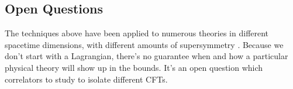 \documentclass[11pt]{ws-rv9x6}
\newcommand\<\langle
\renewcommand\>\rangle
\renewcommand\.{\cdot}
\begin{document}
\subsection{Open Questions}

The techniques above have been applied to numerous theories in different spacetime dimensions, with different amounts of supersymmetry \cite{Rattazzi:2008pe, Rychkov:2009ij, Caracciolo:2009bx, Poland:2010wg, Rattazzi:2010gj, Rattazzi:2010yc, Vichi:2011ux, Poland:2011ey, Rychkov:2011et, ElShowk:2012ht,Liendo:2012hy, Beem:2013qxa, Kos:2013tga, El-Showk:2013nia, Alday:2013opa, Gaiotto:2013nva,Bashkirov:2013vya, Berkooz:2014yda, El-Showk:2014dwa, Nakayama:2014lva,Nakayama:2014yia, Alday:2014qfa, Chester:2014fya, Kos:2014bka, Caracciolo:2014cxa, Nakayama:2014sba, Golden:2014oqa, Chester:2014mea, Paulos:2014vya, Beem:2014zpa, Simmons-Duffin:2015qma, Bobev:2015vsa, Bobev:2015jxa, Kos:2015mba, Chester:2015qca, Beem:2015aoa, Iliesiu:2015qra,poland2015exploring,Lemos:2015awa,Lin:2015wcg,Chester:2015lej,Chester:2016wrc}.  Because we don't start with a Lagrangian, there's no guarantee when and how a particular physical theory will show up in the bounds. It's an open question which correlators to study to isolate different CFTs.
\end{document}
